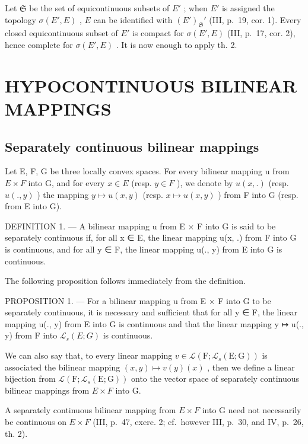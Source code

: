 Let \(\mathfrak{S}\) be the set of equicontinuous subsets of \(E'\) ; when \(E'\) is assigned the topology \(\sigma(E', E)\) , \(E\) can be identified with \((E')_{\mathfrak{S}}'\) (III, p.~19, cor. 1). Every closed equicontinuous subset of \(E'\) is compact for \(\sigma(E', E)\) (III, p.~17, cor. 2), hence complete for \(\sigma(E', E)\) . It is now enough to apply th. 2.

\section{HYPOCONTINUOUS BILINEAR MAPPINGS}

\subsection{Separately continuous bilinear mappings}

Let E, F, G be three locally convex spaces. For every bilinear mapping u from \(E \times F\) into G, and for every \(x \in E\) (resp. \(y \in F\) ), we denote by \(u(x, .)\) (resp. \(u(., y)\) ) the mapping \(y \mapsto u(x, y)\) (resp. \(x \mapsto u(x, y)\) ) from F into G (resp. from E into G).

DEFINITION 1. --- A bilinear mapping u from E × F into G is said to be separately continuous if, for all x ∈ E, the linear mapping u(x, .) from F into G is continuous, and for all y ∈ F, the linear mapping u(., y) from E into G is continuous.

The following proposition follows immediately from the definition.

PROPOSITION 1. --- For a bilinear mapping u from E × F into G to be separately continuous, it is necessary and sufficient that for all y ∈ F, the linear mapping u(., y) from E into G is continuous and that the linear mapping y ↦ u(., y) from F into \(\mathcal{L}_s(E; G)\) is continuous.

We can also say that, to every linear mapping \(v \in \mathcal{L}\left(\mathrm{F}; \mathcal{L}_{s}(\mathrm{E}; \mathrm{G})\right)\) is associated the bilinear mapping \((x, y) \mapsto v(y)(x)\) , then we define a linear bijection from \(\mathcal{L}(\mathrm{F}; \mathcal{L}_{s}(\mathrm{E}; \mathrm{G}))\) onto the vector space of separately continuous bilinear mappings from \(E \times F\) into G.

A separately continuous bilinear mapping from \(E \times F\) into G need not necessarily be continuous on \(E \times F\) (III, p.~47, exerc. 2; cf.~however III, p.~30, and IV, p.~26, th. 2).


